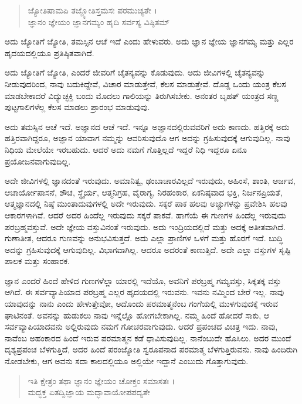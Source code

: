 \begin{verse}
ಜ್ಯೋತಿಷಾಮಪಿ ತಜ್ಜ್ಯೋತಿಸ್ತಮಸಃ ಪರಮುಚ್ಯತೇ ।\\ಜ್ಞಾನಂ ಜ್ಞೇಯಂ ಜ್ಞಾನಗಮ್ಯಂ ಹೃದಿ ಸರ್ವಸ್ಯ ವಿಷ್ಠಿತಮ್ 
\end{verse}

{\small ಅದು ಜ್ಯೋತಿಗೆ ಜ್ಯೋತಿ, ತಮಸ್ಸಿನ ಆಚೆ ಇದೆ ಎಂದು ಹೇಳುವರು. ಅದು ಜ್ಞಾನ ಜ್ಞೇಯ ಜ್ಞಾನಗಮ್ಯ ಮತ್ತು ಎಲ್ಲರ ಹೃದಯದಲ್ಲಿಯೂ ಪ್ರತಿಷ್ಠಿತವಾಗಿದೆ.}

ಅದು ಜ್ಯೋತಿಗೆ ಜ್ಯೋತಿ, ಎಂದರೆ ಜೀವರಿಗೆ ಚೈತನ್ಯವನ್ನು ಕೊಡುವುದು. ಅದು ಜೀವಿಗಳಲ್ಲಿ ಚೈತನ್ಯವನ್ನು ನೀಡುವುದರಿಂದ, ನಾವು ಬದುಕಿದ್ದೇವೆ, ವಿಚಾರ ಮಾಡುತ್ತೇವೆ, ಕೆಲಸ ಮಾಡುತ್ತೇವೆ. ದೊಡ್ಡ ಒಂದು ಯಂತ್ರ ಕೆಲಸ ಮಾಡಬೇಕಾದರೆ ವಿದ್ಯುಚ್ಛಕ್ತಿ ಬಂದು ಮೊದಲು ಗಾಲಿಯನ್ನು ತಿರುಗಿಸಬೇಕು. ಅನಂತರ ಬೃಹತ್ ಯಂತ್ರದ ಸಣ್ಣ ಪುಟ್ಟಗಾಲಿಗಳೆಲ್ಲ ಕೆಲಸ ಮಾಡಲು ಪ್ರಾರಂಭ ಮಾಡುವುವು.

ಅದು ತಮಸ್ಸಿನ ಆಚೆ ಇದೆ. ಅಜ್ಞಾನದ ಆಚೆ ಇದೆ. ಇನ್ನೂ ಅಜ್ಞಾನದಲ್ಲಿರುವವರಿಗೆ ಅದು ಕಾಣದು. ಹತ್ತಿರಕ್ಕೆ ಅದು ಹತ್ತಿರವಾಗಿದ್ದರೂ, ಅಜ್ಞಾನ ಯಾವಾಗ ನಮ್ಮನ್ನು ಆವರಿಸುವುದೊ ಆಗ ಅದನ್ನು ಗ್ರಹಿಸುವುದಕ್ಕೆ ಆಗುವುದಿಲ್ಲ. ನಾವು ನಿಧಿಯ ಮೇಲೆಯೇ ಇರಬಹುದು. ಆದರೆ ಅದು ನಮಗೆ ಗೊತ್ತಿಲ್ಲದೆ ಇದ್ದರೆ ನಿಧಿ ಇದ್ದರೂ ಏನೂ ಪ್ರಯೋಜನವಾಗುವುದಿಲ್ಲ.

ಅದೇ ಜೀವಿಗಳಲ್ಲಿ ಜ್ಞಾನದಂತೆ ಇರುವುದು. ಅಮಾನಿತ್ವ, ಢಂಬಾಚಾರವಿಲ್ಲದೆ ಇರುವುದು, ಅಹಿಂಸೆ, ಶಾಂತಿ, ಆರ್ಜವ, ಆಚಾರ್ಯೋಪಾಸನೆ, ಶೌಚ, ಸ್ಥೈರ್ಯ, ಆತ್ಮನಿಗ್ರಹ, ವೈರಾಗ್ಯ, ನಿರಹಂಕಾರ, ಏಕನಿಷ್ಠವಾದ ಭಕ್ತಿ, ನಿರ್ಜನಪ್ರಿಯತೆ, ಆತ್ಮಜ್ಞಾನದಲ್ಲಿ ನಿಷ್ಠೆ ಮುಂತಾದುವುಗಳಲ್ಲಿ ಅದೇ ಇರುವುದು. ಸಕ್ಕರೆ ಪಾಕ ಹಲವು ಅಚ್ಚುಗಳನ್ನು ಪ್ರವೇಶಿಸಿ ಹಲವು ಆಕಾರಗಳಾಗಿವೆ. ಆದರೆ ಅದರ ಹಿಂದೆಲ್ಲ ಇರುವುದು ಸಕ್ಕರೆ ಪಾಕವೆ. ಹಾಗೆಯೆ ಈ ಗುಣಗಳ ಹಿಂದೆಲ್ಲ ಇರುವುದು ಪರಬ್ರಹ್ಮವಸ್ತುವೆ. ಅದೇ ಜ್ಞೇಯ ವಸ್ತುವಿನಂತೆ ಇರುವುದು. ಅದು ಇಂದ್ರಿಯದಲ್ಲಿದೆ ಮತ್ತು ಅದಕ್ಕೆ ಅತೀತವಾಗಿದೆ. ಗುಣಾತೀತ, ಆದರೂ ಗುಣವನ್ನು ಅನುಭವಿಸುತ್ತದೆ. ಅದು ಎಲ್ಲಾ ಪ್ರಾಣಿಗಳ ಒಳಗೆ ಮತ್ತು ಹೊರಗೆ ಇದೆ. ಬುದ್ಧಿ ಅದನ್ನು ಗ್ರಹಿಸುವುದಕ್ಕೆ ಆಗುವುದಿಲ್ಲ. ವಿಭಾಗವಾಗಿಲ್ಲ. ಆದರೂ ಅದರಂತೆ ಕಾಣುತ್ತಿದೆ. ಅದೇ ಎಲ್ಲಾ ವಸ್ತುಗಳ ಸೃಷ್ಟಿ ಪಾಲಕ ಮತ್ತು ಸಂಹಾರಕ.

ಜ್ಞಾನ ಎಂದರೆ ಹಿಂದೆ ಹೇಳಿದ ಗುಣಗಳೆಲ್ಲಾ ಯಾರಲ್ಲಿ ಇದೆಯೊ, ಅವನಿಗೆ ಪರಬ್ರಹ್ಮ ಗಮ್ಯವಸ್ತು, ಸಿಕ್ಕತಕ್ಕ ವಸ್ತು ಆಗಿದೆ. ಈ ಸರ್ವವ್ಯಾಪಿಯಾದ ಪರಬ್ರಹ್ಮ ಎಲ್ಲರ ಹೃದಯದಲ್ಲಿ ಇರುವನು. ಇವನು ನಮ್ಮಿಂದ ಬೇರೆ ಇಲ್ಲ. ನಾವು ಯಾವುದನ್ನು ನಾನು ಎಂದು ಹೇಳುತ್ತೇವೋ, ಅದೊಂದು ಪರಮಾತ್ಮನೆಂಬ ಗಂಗೆಯಲ್ಲಿ ಮುಳಗುವುದಕ್ಕೆ ಇರುವ ಘಾಟಿನಂತೆ. ಅವನನ್ನು ಹುಡುಕಲು ನಾವು ಇನ್ನೆಲ್ಲೊ ಹೋಗಬೇಕಾಗಿಲ್ಲ. ನಮ್ಮ ಹಿಂದೆ ಹೋದರೆ ಸಾಕು, ಆ ಸರ್ವವ್ಯಾಪಿಯಾದವನು ಅಲ್ಲಿರುವುದು ನಮಗೆ ಗೋಚರವಾಗುವುದು. ಆದರೆ ಪ್ರಪಂಚದ ವಿಚಿತ್ರ ಇದು. ನಾವು, ನಾವೆಂಬ ಅಹಂಕಾರದ ಹಿಂದೆ ಇರುವ ಪರಮಾತ್ಮನ ಕಡೆ ಧಾವಿಸುವುದಿಲ್ಲ. ನಾನೆಂಬುದೇ ಹೊಸಿಲು. ಅದರ ಮುಂದೆ ದೃಶ್ಯಪ್ರಪಂಚ ಬೆಳಗುತ್ತಿದೆ, ಅದರ ಹಿಂದೆ ಪರಂಜ್ಯೋತಿ ಸ್ವರೂಪನಾದ ಪರಮಾತ್ಮ ಬೆಳಗುತ್ತಿರುವನು. ನಾವು ಹಿಂದಿರುಗಿ ನೋಡಬೇಕು, ಆಗ ಅವನು ಸದಾ ಕಾಲದಲ್ಲಿಯೂ ಅಲ್ಲಿಯೇ ಇದ್ದಾನೆ ಎಂಬುದು ಗೊತ್ತಾಗುವುದು.

\begin{verse}
ಇತಿ ಕ್ಷೇತ್ರಂ ತಥಾ ಜ್ಞಾನಂ ಜ್ಞೇಯಂ ಚೋಕ್ತಂ ಸಮಾಸತಃ ।\\ಮದ್ಭಕ್ತ ಏತದ್ವಿಜ್ಞಾಯ ಮದ್ಭಾವಾಯೋಪಪದ್ಯತೇ 
\end{verse}

